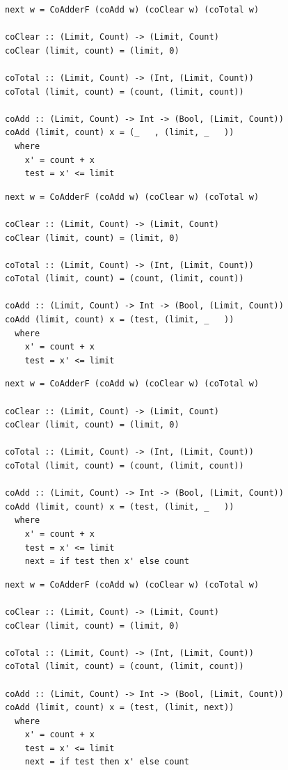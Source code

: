 \documentclass{beamer}
\begin{document}
\begin{frame}[fragile]
\begin{overprint}
\begin{verbatim}
    \end{verbatim}
    \begin{verbatim}
next w = CoAdderF (coAdd w) (coClear w) (coTotal w)

coClear :: (Limit, Count) -> (Limit, Count)
coClear (limit, count) = (limit, 0)

coTotal :: (Limit, Count) -> (Int, (Limit, Count))
coTotal (limit, count) = (count, (limit, count))

coAdd :: (Limit, Count) -> Int -> (Bool, (Limit, Count))
coAdd (limit, count) x = (_   , (limit, _   ))
  where
    x' = count + x
    test = x' <= limit

  \end{verbatim}
    \begin{verbatim}
next w = CoAdderF (coAdd w) (coClear w) (coTotal w)

coClear :: (Limit, Count) -> (Limit, Count)
coClear (limit, count) = (limit, 0)

coTotal :: (Limit, Count) -> (Int, (Limit, Count))
coTotal (limit, count) = (count, (limit, count))

coAdd :: (Limit, Count) -> Int -> (Bool, (Limit, Count))
coAdd (limit, count) x = (test, (limit, _   ))
  where
    x' = count + x
    test = x' <= limit

  \end{verbatim}
    \begin{verbatim}
next w = CoAdderF (coAdd w) (coClear w) (coTotal w)

coClear :: (Limit, Count) -> (Limit, Count)
coClear (limit, count) = (limit, 0)

coTotal :: (Limit, Count) -> (Int, (Limit, Count))
coTotal (limit, count) = (count, (limit, count))

coAdd :: (Limit, Count) -> Int -> (Bool, (Limit, Count))
coAdd (limit, count) x = (test, (limit, _   ))
  where
    x' = count + x
    test = x' <= limit
    next = if test then x' else count
  \end{verbatim}
    \begin{verbatim}
next w = CoAdderF (coAdd w) (coClear w) (coTotal w)

coClear :: (Limit, Count) -> (Limit, Count)
coClear (limit, count) = (limit, 0)

coTotal :: (Limit, Count) -> (Int, (Limit, Count))
coTotal (limit, count) = (count, (limit, count))

coAdd :: (Limit, Count) -> Int -> (Bool, (Limit, Count))
coAdd (limit, count) x = (test, (limit, next))
  where
    x' = count + x
    test = x' <= limit
    next = if test then x' else count
  \end{verbatim}
  \end{overprint}
\end{frame}
\end{document}
